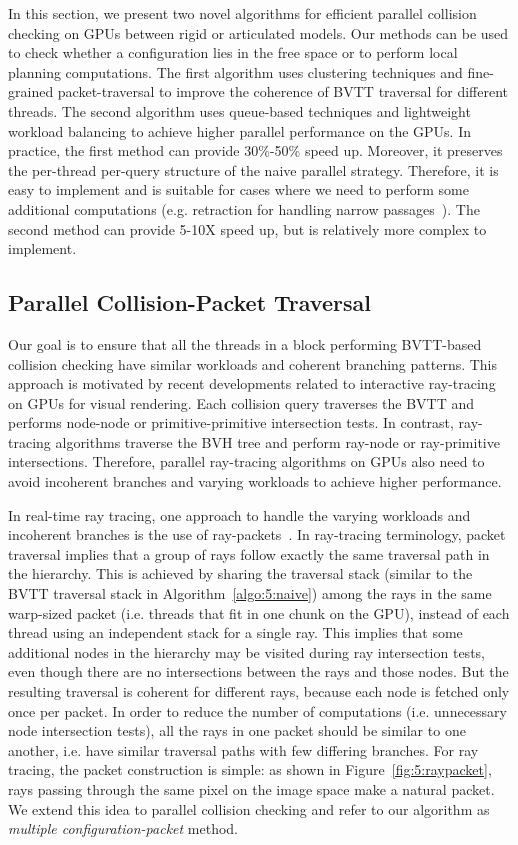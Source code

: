 In this section, we present two novel algorithms for efficient parallel collision checking on GPUs between rigid or articulated models. Our methods can be used to check whether a configuration lies in the free space or to perform local planning computations. The first algorithm uses clustering techniques and fine-grained packet-traversal to improve the
coherence of BVTT traversal for different threads. The second algorithm uses queue-based techniques and lightweight workload
balancing to achieve higher parallel performance on the GPUs. In practice, the first method can provide 30\%-50\% speed up.
Moreover, it preserves the per-thread per-query structure of the naive parallel strategy. Therefore, it is easy to implement
and is suitable for cases where we need to perform some additional computations (e.g. retraction for handling narrow passages~\cite{Zhang08-ICRA}). The second method can provide 5-10X speed up, but is relatively more complex to implement.


\subsection{Parallel Collision-Packet Traversal}
\label{sec:5:algorithm:packet}
Our goal is to ensure that all the threads in a block performing BVTT-based collision checking have similar workloads and coherent
branching patterns. This approach is motivated by recent developments related to interactive ray-tracing on GPUs for visual
rendering. Each collision query traverses the BVTT and performs node-node or primitive-primitive intersection tests. In contrast,
ray-tracing algorithms traverse the BVH tree and perform ray-node or ray-primitive intersections. Therefore, parallel ray-tracing
algorithms on GPUs also need to avoid incoherent branches and varying workloads to achieve higher performance.

In real-time ray tracing, one approach to handle the varying workloads and incoherent branches is the
use of ray-packets~\cite{Gunther07,Aila2009}. In ray-tracing terminology, packet traversal implies that a group of
rays follow
exactly the same traversal path in the hierarchy. This is achieved by sharing the traversal stack (similar to the BVTT traversal stack in Algorithm~\ref{algo:5:naive}) among the rays in the same warp-sized packet (i.e. threads that fit in one chunk on the GPU), instead of each thread using an independent stack for a single ray.
This implies that some additional nodes in the hierarchy may be visited during ray intersection tests, even though there are no intersections between the rays and those nodes. But the resulting traversal is coherent for different rays, because each node is fetched only once per packet. In order to reduce the number of computations (i.e. unnecessary node intersection tests), all the rays in one packet should be similar to one another, i.e. have similar traversal paths with few differing branches. For ray tracing, the packet construction is simple: as shown in Figure~\ref{fig:5:raypacket}, rays passing through the same pixel on the image space make a natural packet. We extend this idea to parallel collision checking and refer to our algorithm as \emph{multiple configuration-packet} method.

